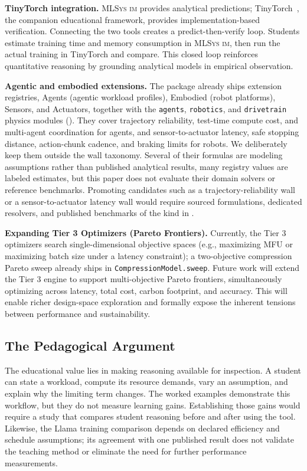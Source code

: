 \documentclass[10pt,twocolumn]{article}
\newcommand{\mlsysim}{\mbox{\textsc{MLSys}\,\textperiodcentered\,\textsc{im}}\xspace}
\begin{document}
\textbf{TinyTorch integration.} \mlsysim provides analytical predictions; TinyTorch~\citep{tinytorch2025}, the companion educational framework, provides implementation-based verification. Connecting the two tools creates a predict-then-verify loop. Students estimate training time and memory consumption in \mlsysim, then run the actual training in TinyTorch and compare. This closed loop reinforces quantitative reasoning by grounding analytical models in empirical observation.

\textbf{Agentic and embodied extensions.} The package already ships \CountRegistriesExtension{} extension registries, Agents (agentic workload profiles), Embodied (robot platforms), Sensors, and Actuators, together with the \texttt{agents}, \texttt{robotics}, and \texttt{drivetrain} physics modules (). They cover trajectory reliability, test-time compute cost, and multi-agent coordination for agents, and sensor-to-actuator latency, safe stopping distance, action-chunk cadence, and braking limits for robots. We deliberately keep them outside the wall taxonomy. Several of their formulas are modeling assumptions rather than published analytical results, many registry values are labeled estimates, but this paper does not evaluate their domain solvers or reference benchmarks. Promoting candidates such as a trajectory-reliability wall or a sensor-to-actuator latency wall would require sourced formulations, dedicated resolvers, and published benchmarks of the kind in .

\textbf{Expanding Tier 3 Optimizers (Pareto Frontiers).} Currently, the Tier 3 optimizers search single-dimensional objective spaces (e.g., maximizing MFU or maximizing batch size under a latency constraint); a two-objective compression Pareto sweep already ships in \texttt{CompressionModel.sweep}. Future work will extend the Tier 3 engine to support multi-objective Pareto frontiers, simultaneously optimizing across latency, total cost, carbon footprint, and accuracy. This will enable richer design-space exploration and formally expose the inherent tensions between performance and sustainability.

\subsection{The Pedagogical Argument}

The educational value lies in making reasoning available for inspection. A student can state a workload, compute its resource demands, vary an assumption, and explain why the limiting term changes. The worked examples demonstrate this workflow, but they do not measure learning gains. Establishing those gains would require a study that compares student reasoning before and after using the tool. Likewise, the Llama training comparison depends on declared efficiency and schedule assumptions; its agreement with one published result does not validate the teaching method or eliminate the need for further performance measurements.
\end{document}
